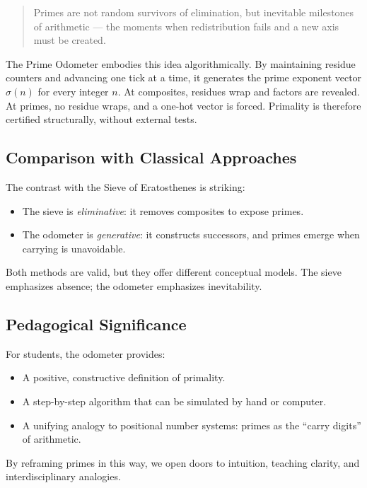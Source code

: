 \documentclass[11pt]{article}
\theoremstyle{definition}
\begin{document}
\begin{quote}
Primes are not random survivors of elimination, 
but inevitable milestones of arithmetic --- 
the moments when redistribution fails and a new axis must be created.
\end{quote}

The Prime Odometer embodies this idea algorithmically.  
By maintaining residue counters and advancing one tick at a time, 
it generates the prime exponent vector $\sigma(n)$ for every integer $n$.  
At composites, residues wrap and factors are revealed.  
At primes, no residue wraps, and a one-hot vector is forced.  
Primality is therefore certified structurally, without external tests.

\subsection*{Comparison with Classical Approaches}

The contrast with the Sieve of Eratosthenes is striking:
\begin{itemize}
  \item The sieve is \emph{eliminative}: it removes composites to expose primes.  
  \item The odometer is \emph{generative}: it constructs successors, 
        and primes emerge when carrying is unavoidable.
\end{itemize}

Both methods are valid, but they offer different conceptual models.  
The sieve emphasizes absence; the odometer emphasizes inevitability.  

\subsection*{Pedagogical Significance}

For students, the odometer provides:
\begin{itemize}
  \item A positive, constructive definition of primality.  
  \item A step-by-step algorithm that can be simulated by hand or computer.  
  \item A unifying analogy to positional number systems: 
        primes as the ``carry digits'' of arithmetic.  
\end{itemize}

By reframing primes in this way, we open doors to intuition, teaching clarity, 
and interdisciplinary analogies.  
\end{document}

